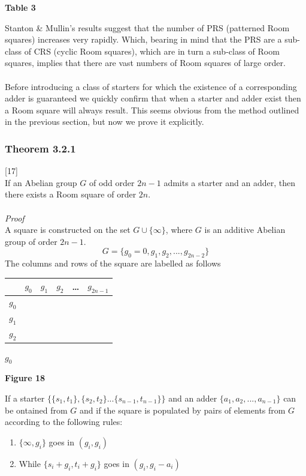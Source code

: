 \documentclass[
  12pt,
  a4paper]{book}
\begin{document}
\textbf{Table 3}

Stanton \& Mullin's results suggest that the number of PRS (patterned
Room squares) increases very rapidly. Which, bearing in mind that the
PRS are a sub-class of CRS (cyclic Room squares), which are in turn a
sub-class of Room squares, implies that there are vast numbers of Room
squares of large order.\\
~\\
Before introducing a class of starters for which the existence of a
corresponding adder is guaranteed we quickly confirm that when a starter
and adder exist then a Room square will always result. This seems
obvious from the method outlined in the previous section, but now we
prove it explicitly.

\hypertarget{theorem-3.2.1}{%
\subsubsection{Theorem 3.2.1}\label{theorem-3.2.1}}

{[}17{]}\\
If an Abelian group \(G\) of odd order \(2n-1\) admits a starter and an
adder, then there exists a Room square of order \(2n\).\\
~\\
\emph{Proof}\\
A square is constructed on the set \(G \cup \{\infty\}\), where \(G\) is
an additive Abelian group of order \(2n-1\).
\[G=\{g_0=0,g_1,g_2,...,g_{2n-2}\}\] The columns and rows of the square
are labelled as follows

\begin{longtable}[]{@{}lccccc@{}}
\toprule
& \(g_0\) & \(g_1\) & \(g_2\) & \ldots{} & \(g_{2n-1}\)\tabularnewline
\midrule
\endhead
\(g_0\) & & & & &\tabularnewline
\(g_1\) & & & & &\tabularnewline
\(g_2\) & & & & &\tabularnewline
\bottomrule
\end{longtable}

\(g_0\)

\textbf{Figure 18}

If a starter \(\{\{s_1,t_1\},\{s_2,t_2\}...\{s_{n-1},t_{n-1}\}\}\) and
an adder \(\{a_1,a_2,...,a_{n-1}\}\) can be ontained from \(G\) and if
the square is populated by pairs of elements from \(G\) according to the
following rules:

\begin{enumerate}
\def\labelenumi{\arabic{enumi}.}
\item
  \(\{\infty,g_i\}\) goes in \((g_i,g_i)\)
\item
  While \(\{s_i+g_i,t_i+g_i\}\) goes in \((g_i,g_i-a_i)\)
\end{enumerate}
\end{document}
